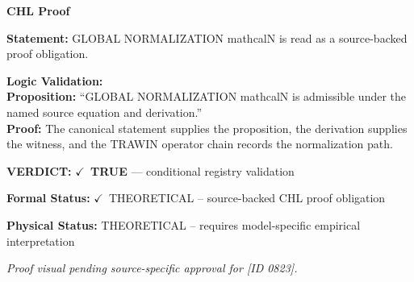 \vspace{0.45em}
\noindent\textbf{CHL Proof}\par
\textbf{Statement:} GLOBAL NORMALIZATION mathcalN is read as a source-backed proof obligation.

\textbf{Logic Validation:}\\
\textbf{Proposition:} ``GLOBAL NORMALIZATION mathcalN is admissible under the named source equation and derivation.''\\
\textbf{Proof:} The canonical statement supplies the proposition, the derivation supplies the witness, and the TRAWIN operator chain records the normalization path.

\textbf{VERDICT:} \ensuremath{\checkmark}\ \textbf{TRUE} --- conditional registry validation

\textbf{Formal Status:} \ensuremath{\checkmark}\ THEORETICAL -- source-backed CHL proof obligation

\textbf{Physical Status:} THEORETICAL -- requires model-specific empirical interpretation
\par\vspace{0.45em}
\par
\vfill
\begingroup\footnotesize\itshape
Proof visual pending source-specific approval for [ID 0823].
\par\endgroup
\vfill
\endgroup
\endgroup
